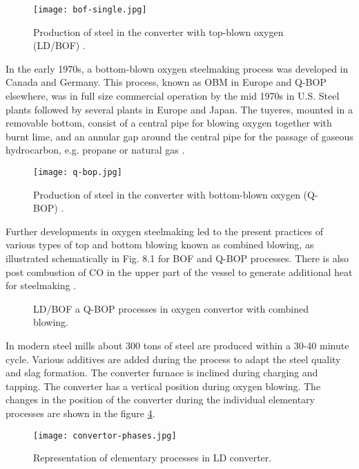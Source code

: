 \begin{figure}[h!]
	\centering
	\texttt{[image: bof-single.jpg]}
	\caption{Production of steel in the converter with top-blown oxygen (LD/BOF) \citep{Turkdogan1996}.}
	\label{o:1}
\end{figure}

In the early 1970s, a bottom-blown oxygen steelmaking process was developed in Canada and Germany. This process, known as OBM in Europe and Q-BOP elsewhere, was in full size commercial operation by the mid 1970s in U.S. Steel plants followed by several plants in Europe and Japan. The tuyeres, mounted in a removable bottom, consist of a central pipe for blowing oxygen together with burnt lime, and an annular gap around the central pipe for the passage of gaseous hydrocarbon, e.g. propane or natural gas \citep{Turkdogan1996}.

\begin{figure}[h!]
	\centering
	\texttt{[image: q-bop.jpg]}
	\caption{Production of steel in the converter with bottom-blown oxygen (Q-BOP) \citep{Turkdogan1996}.}
	\label{o:2}
\end{figure}

Further developments in oxygen steelmaking led to the present practices of various types of top and bottom blowing known as combined blowing, as illustrated schematically in Fig. 8.1 for BOF and Q-BOP processes. There is also post combustion of CO in the upper part of the vessel to generate additional heat for steelmaking \citep{Turkdogan1996}.

\begin{figure}[h!tbp]
	\centering
	\hfill
	\caption{LD/BOF a Q-BOP processes in oxygen convertor with combined blowing.}
	\label{o:3}
\end{figure}

In modern steel mills about 300 tons of steel are produced within a 30-40 minute cycle. Various additives are added during the process to adapt the steel quality and slag formation. The converter furnace is inclined during charging and tapping. The converter has a vertical position during oxygen blowing. The changes in the position of the converter during the individual elementary processes are shown in the figure \ref{o:4}.

\begin{figure}[h!]
	\centering
	\texttt{[image: convertor-phases.jpg]}
	\caption{Representation of elementary processes in LD converter.}
	\label{o:4}
\end{figure}

